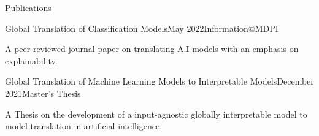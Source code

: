 \documentclass{resume}
\begin{document}
\begin{rSection}{Publications}

\begin{rSubsection}{Global Translation of Classification Models}{May 2022}{{Information@MDPI}}{}
    \item A peer-reviewed journal paper on translating A.I models with an emphasis on explainability.
\end{rSubsection}
\begin{rSubsection}{Global Translation of Machine Learning Models to Interpretable Models}{December 2021}{{Master's Thesis}}{}
    \item A Thesis on the development of a input-agnostic globally interpretable model to model translation in artificial intelligence.
\end{rSubsection}

\end{rSection}
\end{document}
